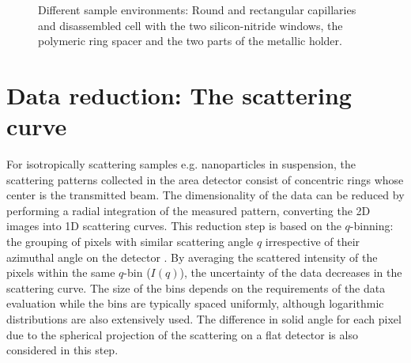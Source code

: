 \begin{figure}%
	\centering
		\caption{Different sample environments: Round and rectangular capillaries and disassembled cell with the two silicon-nitride windows, the polymeric ring spacer and the two parts of the metallic holder.}
		\label{fig:SampleEnvironment}
\end{figure}

\section{Data reduction: The scattering curve}

For isotropically scattering samples e.g. nanoparticles in suspension, the scattering patterns collected in the area detector consist of concentric rings whose center is the transmitted beam. The dimensionality of the data can be reduced by performing a radial integration of the measured pattern, converting the 2D images into 1D scattering curves. This reduction step is based on the $q$-binning: the grouping of pixels with similar scattering angle $q$ irrespective of their azimuthal angle on the detector \citep{pauw_everything_2013}. By averaging the scattered intensity of the pixels within the same $q$-bin ($I(q)$), the uncertainty of the data decreases in the scattering curve. The size of the bins depends on the requirements of the data evaluation while the bins are typically spaced uniformly, although logarithmic distributions are also extensively used. The difference in solid angle for each pixel due to the spherical projection of the scattering on a flat detector is also considered in this step.


